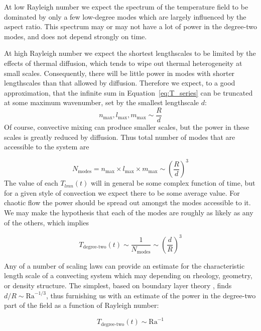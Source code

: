 \documentclass[extra,mreferee]{gji}
\begin{document}
At low Rayleigh number we expect the spectrum of the temperature field to be dominated by only a few low-degree modes which are largely influenced by the aspect ratio.
This spectrum may or may not have a lot of power in the degree-two modes, and does not depend strongly on time.

At high Rayleigh number we expect the shortest lengthscales to be limited by the effects of thermal diffusion,
which tends to wipe out thermal heterogeneity at small scales.  Consequently, there will be little power in modes
with shorter lengthscales than that allowed by diffusion. 
Therefore we expect, to a good approximation, that the infinite sum in Equation~\eqref{eq:T_series} can be truncated at some maximum wavenumber, set by the smallest lengthscale $d$:
\begin{equation}
n_{\text{max}}, l_{\text{max}}, m_{\text{max}} \sim \frac{R}{d}
\end{equation}
Of course, convective mixing can produce smaller scales, but the power in these scales
is greatly reduced by diffusion.
Thus total number of modes that are accessible to the system are 

\begin{equation}
N_{\text{modes}} = n_{\text{max}} \times l_{\text{max}} \times m_{\text{max}} \sim \left( \frac{R}{d} \right)^{3}
\end{equation}
The value of each $T_{lmn}(t)$ will in general be some complex function of time, but for a given style of convection we expect there to be some average value.
For chaotic flow the power should be spread out amongst the modes accessible to it.
We may make the hypothesis that each of the modes are roughly as likely as any of the others, which implies

\begin{equation}
T_{\text{degree-two}}(t) \sim \frac{1}{N_{\text{modes}}} \sim \left( \frac{d}{R}\right)^3
\end{equation}

Any of a number of scaling laws can provide an estimate for the characteristic length scale of a convecting system which may depending on rheology, geometry, or density structure.
The simplest, based on boundary layer theory \citep{turcotte1967finite}, finds $d/R \sim \mathrm{Ra}^{-1/3}$, thus furnishing us with an estimate of the power in the degree-two part of the field as a function of Rayleigh number:

\begin{equation}
T_{\text{degree-two}}(t) \sim \mathrm{Ra}^{-1}
\label{eq:degree_two_of_ra}
\end{equation}
\end{document}
